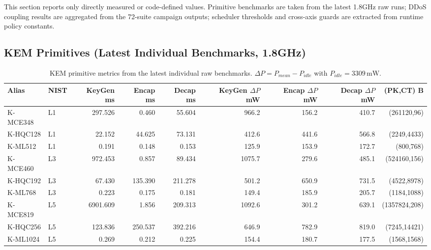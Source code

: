 
This section reports only directly measured or code-defined values. Primitive benchmarks are taken from the latest 1.8GHz raw runs; DDoS coupling results are aggregated from the 72-suite campaign outputs; scheduler thresholds and cross-axis guards are extracted from runtime policy constants.

\subsection{KEM Primitives (Latest Individual Benchmarks, 1.8GHz)}
\begin{table}[t]
\centering
\caption{KEM primitive metrics from the latest individual raw benchmarks. $\Delta P = P_{mean}-P_{idle}$ with $P_{idle}=3309\,\mathrm{mW}$.}
\footnotesize
\setlength{\tabcolsep}{3pt}
\begin{tabular}{@{}llrrrrrrr@{}}\toprule
Alias & NIST & KeyGen ms & Encap ms & Decap ms & KeyGen $\Delta P$ mW & Encap $\Delta P$ mW & Decap $\Delta P$ mW & (PK,CT) B \\ \midrule
K-MCE348 & L1 & 297.526 & 0.460 & 55.604 & 966.2 & 156.2 & 410.7 & (261120,96) \\
K-HQC128 & L1 & 22.152 & 44.625 & 73.131 & 412.6 & 441.6 & 566.8 & (2249,4433) \\
K-ML512 & L1 & 0.191 & 0.148 & 0.153 & 125.9 & 153.9 & 172.7 & (800,768) \\
K-MCE460 & L3 & 972.453 & 0.857 & 89.434 & 1075.7 & 279.6 & 485.1 & (524160,156) \\
K-HQC192 & L3 & 67.430 & 135.390 & 211.278 & 501.2 & 650.9 & 731.5 & (4522,8978) \\
K-ML768 & L3 & 0.223 & 0.175 & 0.181 & 149.4 & 185.9 & 205.7 & (1184,1088) \\
K-MCE819 & L5 & 6901.609 & 1.856 & 209.313 & 1092.6 & 301.2 & 639.1 & (1357824,208) \\
K-HQC256 & L5 & 123.836 & 250.537 & 392.216 & 646.9 & 782.9 & 819.0 & (7245,14421) \\
K-ML1024 & L5 & 0.269 & 0.212 & 0.225 & 154.4 & 180.7 & 177.5 & (1568,1568) \\
\bottomrule\end{tabular}
\label{tab:kem-primitives-latest-manual}
\end{table}

